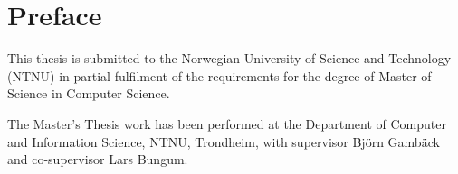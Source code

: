 \section*{Preface}

This thesis is submitted to the Norwegian University of Science and Technology (NTNU) in partial fulfilment of the requirements for the degree of Master of Science in Computer Science.

The Master's Thesis work has been performed at the Department of Computer and Information Science, NTNU, Trondheim, with supervisor Bj\"{o}rn Gamb\"{a}ck and co-supervisor Lars Bungum.

\cleardoublepage